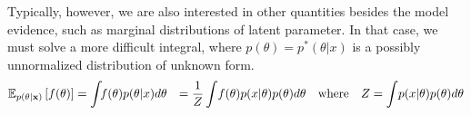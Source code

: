 Typically, however, we are also interested in other quantities besides the model evidence, such as marginal distributions of latent parameter.  In that case, we must solve a more difficult integral, where $p(\theta) = p^* ( \theta | x )$ is a possibly unnormalized distribution of unknown form.
%
%
%
%
\begin{align}
\mathbb{E}_{p(\theta | {\bf{x}})} \left[ {f(\theta)} \right] & = \int \!\! f(\theta) p(\theta | x ) d\theta 
& = \frac{1}{Z} \int \! f(\theta) p( x | \theta ) p( \theta ) d\theta \quad \textrm{where}  \quad  Z = \int \! p( x | \theta ) p( \theta ) d\theta
\label{eq:post_marginal}
\end{align}
%
%
%
%
%
%
%
